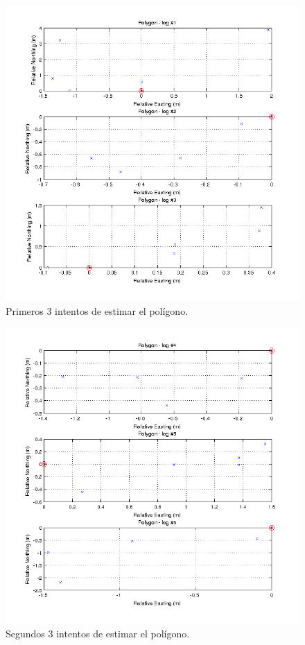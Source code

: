 \documentclass[spanish,12pt,a4paper,titlepage]{report}
\begin{document}
\begin{figure}[h!]
  \begin{center}
  \includegraphics[width=1\textwidth]{./img/polygon_1.png}
  \end{center}
  \caption{Primeros 3 intentos de estimar el polígono.}
  \label{fig:polygon_1.png}
\end{figure}

\newpage
\begin{figure}[h!]
  \begin{center}
  \includegraphics[width=1\textwidth]{./img/polygon_2.png}
  \end{center}
  \caption{Segundos 3 intentos de estimar el polígono.}
  \label{fig:polygon_2.png}
\end{figure}
\end{document}
